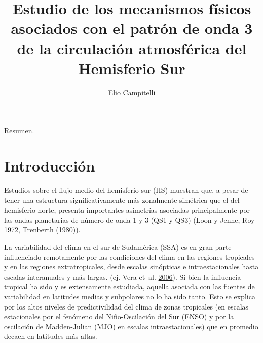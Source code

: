 \documentclass[spanish,a4paper,12p]{book}
\title{Estudio de los mecanismos físicos asociados con el patrón de onda 3 de
la circulación atmosférica del Hemisferio Sur}
\author{Elio Campitelli}
\date{}
\begin{document}
\maketitle

{
\setcounter{tocdepth}{3}
\tableofcontents
}
Resumen.


\listoffigures
\newpage

\chapter{Introducción}\label{introduccion}

Estudios sobre el flujo medio del hemisferio sur (HS) muestran que, a
pesar de tener una estructura significativamente más zonalmente
simétrica que el del hemisferio norte, presenta importantes asimetrías
asociadas principalmente por las ondas planetarias de número de onda 1 y
3 (QS1 y QS3) (Loon y Jenne, Roy \protect\hyperlink{ref-Loon1972}{1972},
Trenberth (\protect\hyperlink{ref-Trenberth1980a}{1980})).

La variabilidad del clima en el sur de Sudamérica (SSA) es en gran parte
influenciado remotamente por las condiciones del clima en las regiones
tropicales y en las regiones extratropicales, desde escalas sinópticas e
intraestacionales hasta escalas interanuales y más largas. (ej. Vera
et~al. \protect\hyperlink{ref-Vera2006}{2006}). Si bien la influencia
tropical ha sido y es extensamente estudiada, aquella asociada con las
fuentes de variabilidad en latitudes medias y subpolares no lo ha sido
tanto. Esto se explica por los altos niveles de predictivilidad del
clima de zonas tropicales (en escalas estacionales por el fenómeno del
Niño-Oscilación del Sur (ENSO) y por la oscilación de Madden-Julian
(MJO) en escalas intraestacionales) que en promedio decaen en latitudes
más altas.
\end{document}
